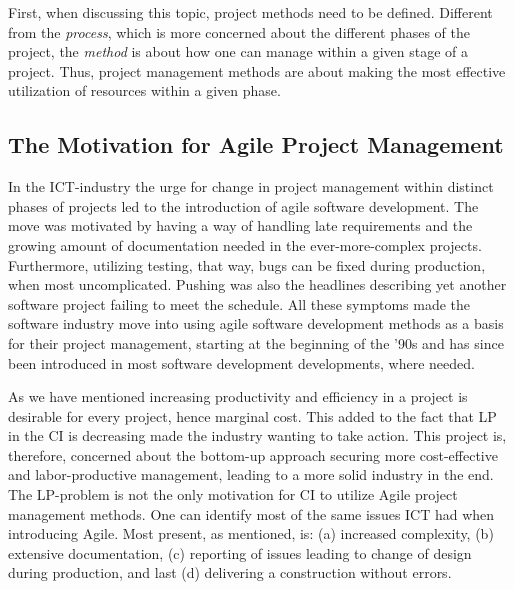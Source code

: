 First, when discussing this topic, project methods need to be defined. Different from the \textit{process}, which is more concerned about the different phases of the project, the \textit{method} is about how one can manage within a given stage of a project. Thus, project management methods are about making the most effective utilization of resources within a given phase. 

\subsection{The Motivation for Agile Project Management}
In the ICT-industry the urge for change in project management within distinct phases of projects led to the introduction of agile software development. The move was motivated by having a way of handling late requirements and the growing amount of documentation needed in the ever-more-complex projects. Furthermore, utilizing testing, that way, bugs can be fixed during production, when most uncomplicated. Pushing was also the headlines describing yet another software project failing to meet the schedule. All these symptoms made the software industry move into using agile software development methods as a basis for their project management, starting at the beginning of the '90s and has since been introduced in most software development developments, where needed.  

As we have mentioned increasing productivity and efficiency in a project is desirable for every project, hence marginal cost. This added to the fact that LP in the CI is decreasing made the industry wanting to take action. This project is, therefore, concerned about the bottom-up approach securing more cost-effective and labor-productive management, leading to a more solid industry in the end. The LP-problem is not the only motivation for CI to utilize Agile project management methods. One can identify most of the same issues ICT had when introducing Agile. Most present, as mentioned, is: (a) increased complexity, (b) extensive documentation, (c) reporting of issues leading to change of design during production, and last (d) delivering a construction without errors.

